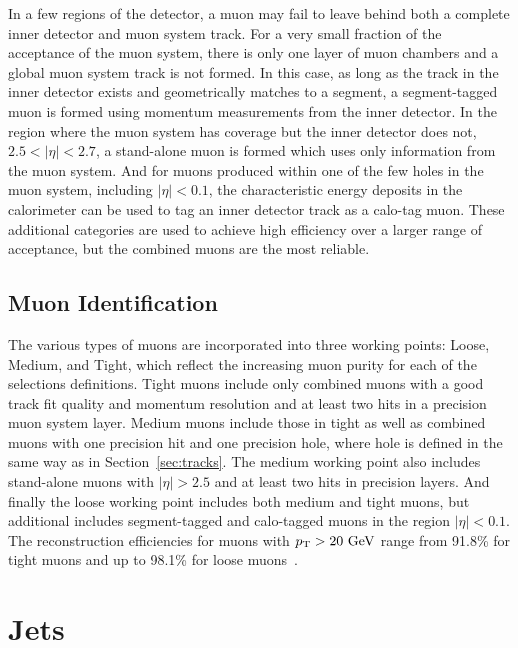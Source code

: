 In a few regions of the detector, a muon may fail to leave behind both a complete inner detector and muon system track.
For a very small fraction of the acceptance of the muon system, there is only one layer of muon chambers and a global muon system track is not formed.
In this case, as long as the track in the inner detector exists and geometrically matches to a segment, a segment-tagged muon is formed using momentum measurements from the inner detector.
In the region where the muon system has coverage but the inner detector does not, $2.5 < |\eta| < 2.7$, a stand-alone muon is formed which uses only information from the muon system.
And for muons produced within one of the few holes in the muon system, including $|\eta| < 0.1$, the characteristic energy deposits in the calorimeter can be used to tag an inner detector track as a calo-tag muon.
These additional categories are used to achieve high efficiency over a larger range of acceptance, but the combined muons are the most reliable.

\subsection{Muon Identification}
\label{sec:muon_id}

The various types of muons are incorporated into three working points: Loose, Medium, and Tight, which reflect the increasing muon purity for each of the selections definitions.
Tight muons include only combined muons with a good track fit quality and momentum resolution and at least two hits in a precision muon system layer.
Medium muons include those in tight as well as combined muons with one precision hit and one precision hole, where hole is defined in the same way as in Section~\ref{sec:tracks}.
The medium working point also includes stand-alone muons with $|\eta| > 2.5$ and at least two hits in precision layers.
And finally the loose working point includes both medium and tight muons, but additional includes segment-tagged and calo-tagged muons in the region $|\eta| < 0.1$.
The reconstruction efficiencies for muons with $p_{\mathrm{T}} > 20\ \mathrm{Ge\kern -0.05em V}$ range from 91.8\% for tight muons and up to 98.1\% for loose muons~\cite{PERF-2015-10}.


\section{Jets}
\label{sec:jets}

